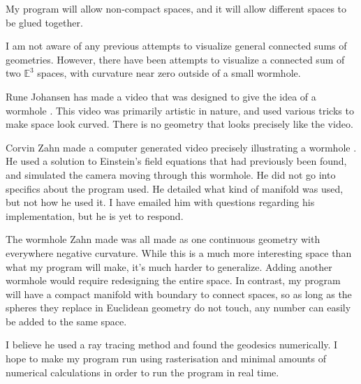 \documentclass[12pt]{amsart}
\begin{document}
My program will allow non-compact spaces, and it will allow different spaces to be glued together.



I am not aware of any previous attempts to visualize general connected sums of geometries. However, there have been attempts to visualize a connected sum of two $\mathbb{E}^3$ spaces, with curvature near zero outside of a small wormhole.

Rune Johansen has made a video that was designed to give the idea of a wormhole \cite{runevision}. This video was primarily artistic in nature, and used various tricks to make space look curved. There is no geometry that looks precisely like the video.

Corvin Zahn made a computer generated video precisely illustrating a wormhole \cite{spacetimetravel}. He used a solution to Einstein's field equations that had previously been found, and simulated the camera moving through this wormhole. He did not go into specifics about the program used. He detailed what kind of manifold was used, but not how he used it. I have emailed him with questions regarding his implementation, but he is yet to respond.

The wormhole Zahn made was all made as one continuous geometry with everywhere negative curvature. While this is a much more interesting space than what my program will make, it's much harder to generalize. Adding another wormhole would require redesigning the entire space. In contrast, my program will have a compact manifold with boundary to connect spaces, so as long as the spheres they replace in Euclidean geometry do not touch, any number can easily be added to the same space.

I believe he used a ray tracing method and found the geodesics numerically. I hope to make my program run using rasterisation and minimal amounts of numerical calculations in order to run the program in real time.







\end{document}

